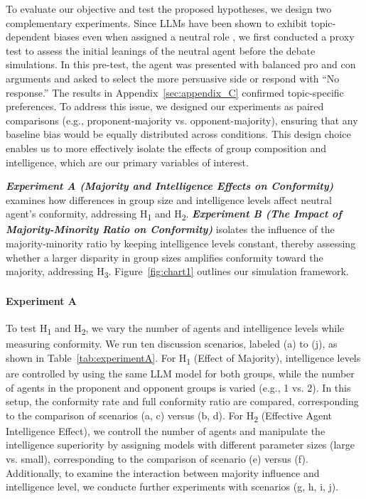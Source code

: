 \documentclass[11pt]{article}
\begin{document}
To evaluate our objective and test the proposed hypotheses, we design two complementary experiments. Since LLMs have been shown to exhibit topic-dependent biases even when assigned a neutral role \citep{taubenfeld2024systematic}, we first conducted a proxy test to assess the initial leanings of the neutral agent before the debate simulations. In this pre-test, the agent was presented with balanced pro and con arguments and asked to select the more persuasive side or respond with “No response.” The results in Appendix~\ref{sec:appendix_C} confirmed topic-specific preferences. To address this issue, we designed our experiments as paired comparisons (e.g., proponent-majority vs. opponent-majority), ensuring that any baseline bias would be equally distributed across conditions. This design choice enables us to more effectively isolate the effects of group composition and intelligence, which are our primary variables of interest.

\textit{\textbf{Experiment A (Majority and Intelligence Effects on Conformity)}} examines how differences in group size and intelligence levels affect neutral agent's conformity, addressing H\textsubscript{1} and H\textsubscript{2}. \textit{\textbf{Experiment B (The Impact of Majority-Minority Ratio on Conformity)}} isolates the influence of the majority-minority ratio by keeping intelligence levels constant, thereby assessing whether a larger disparity in group sizes amplifies conformity toward the majority, addressing H\textsubscript{3}.
Figure~\ref{fig:chart1} outlines our simulation framework.


\paragraph{Experiment A}
To test H\textsubscript{1} and H\textsubscript{2}, we vary the number of agents and intelligence levels while measuring conformity. We run ten discussion scenarios, labeled (a) to (j), as shown in Table~\ref{tab:experimentA}. For H\textsubscript{1} (Effect of Majority), intelligence levels are controlled by using the same LLM model for both groups, while the number of agents in the proponent and opponent groups is varied (e.g., 1 vs. 2). In this setup, the conformity rate and full conformity ratio are compared, corresponding to the comparison of scenarios (a, c) versus (b, d). For H\textsubscript{2} (Effective Agent Intelligence Effect), we controll the number of agents and manipulate the intelligence superiority by assigning models with different parameter sizes (large vs. small), corresponding to the comparison of scenario (e) versus (f). Additionally, to examine the interaction between majority influence and intelligence level, we conducte further experiments with scenarios (g, h, i, j).
\end{document}
